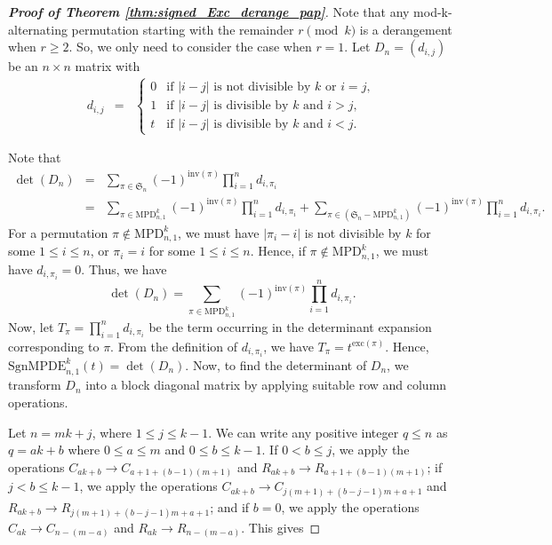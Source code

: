 \documentclass[12pt]{article}
\newcommand{\MPD}{\mathrm{MPD}}
\newcommand{\SMPDE}{\mathrm{SgnMPDE}}
\newcommand{\SSS}{\mathfrak{S}}
\newcommand{\inv}{\mathrm{inv}}
\newcommand{\exc}{\mathrm{exc}}
\begin{document}
\begin{proof}[\textbf{Proof of Theorem \ref{thm:signed_Exc_derange_pap}}]
Note that any mod-k-alternating permutation starting with the remainder $r\pmod k$ is a derangement when $r \geq 2$. So, we only need to consider the case when $r=1$.
Let $D_n= (d_{i,j})$ be an $n \times n$ matrix with
\begin{eqnarray*}
	d_{i,j} & = & \begin{cases}
	0 & \text {if $|i-j|$ is not divisible by $k$ or $i=j$}, \\
	 1 & \text {if $|i-j|$ is divisible by $k$ and $i > j$},\\
	  t & \text {if $|i-j|$ is divisible by $k$ and $i < j$}. 
	 \end{cases}
\end{eqnarray*}   		

Note that
\begin{eqnarray*}
\det(D_n) & = & \displaystyle  \sum _{\pi \in \SSS_n} (-1)^{\inv(\pi)} \prod _{i=1}^n d_{i,\pi_i} \\
  & = & \displaystyle  \sum _{\pi \in \MPD_{n,1}^k } (-1)^{\inv(\pi)} \prod _{i=1}^n d_{i,\pi_i} + \displaystyle  \sum _{\pi \in (\SSS_n - \MPD_{n,1}^k) } (-1)^{\inv(\pi)} \prod _{i=1}^n d_{i,\pi_i}.  
  \end{eqnarray*} 
For a permutation $\pi \not \in \MPD_{n,1}^k$, we must have $|\pi_i-i|$ is not  divisible by $k$ for some $1 \leq i \leq n$, or  $\pi_i =i$ for some $1 \leq i \leq n$. Hence, if  $\pi \not \in \MPD_{n,1}^k$,  we must have $d_{i,\pi_i}=0$. Thus, we have 
\[ \det(D_n) = \sum _{\pi \in \MPD_{n,1}^k } (-1)^{\inv(\pi)} \prod _{i=1}^n d_{i,\pi_i}. \] 
Now, let $T_{\pi} = \prod _{i=1}^n d_{i, \pi_i}$ be the term occurring in the determinant expansion corresponding to $\pi$. From the definition of $d_{i, \pi_i}$, we have $T_{\pi} = t^{\exc(\pi) }$. Hence, $\SMPDE_{n,1}^k(t)=\det(D_n).$ Now, to find the determinant of $D_n$, we transform $D_n$ into a block diagonal matrix by applying suitable row and column operations.

Let $n=mk+j$, where $1 \leq j \leq k-1.$ We can write any positive integer $q \leq n$ as $q=ak+b$ where $0 \leq a \leq m$ and $ 0 \leq b \leq k-1$. If $0 < b \leq j$, we apply the operations $C_{ak+b}\rightarrow C_{a+1+(b-1)(m+1)}$ and $R_{ak+b}\rightarrow R_{a+1+(b-1)(m+1)}$; if $j < b \leq k-1$, we apply the operations $C_{ak+b}\rightarrow C_{j(m+1)+(b-j-1)m+a+1}$ and $R_{ak+b}\rightarrow R_{j(m+1)+(b-j-1)m+a+1}$; and if $b=0$, we apply the operations $C_{ak}\rightarrow C_{n-(m-a)}$ and $R_{ak}\rightarrow R_{n-(m-a)}$. This gives


\end{proof}
\end{document}
